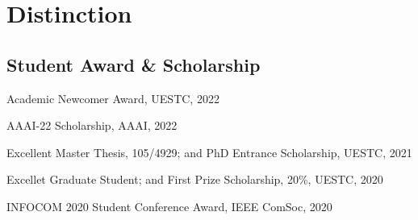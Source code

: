\section*{Distinction}


\subsection*{\hspace{1.6em}Student Award \& Scholarship}
\indent

Academic Newcomer Award, UESTC, 2022

AAAI-22 Scholarship, AAAI, 2022

Excellent Master Thesis, 105/4929; and PhD Entrance Scholarship, UESTC, 2021

Excellet Graduate Student; and First Prize Scholarship, 20\%, UESTC, 2020


INFOCOM 2020 Student Conference Award, IEEE ComSoc, 2020

